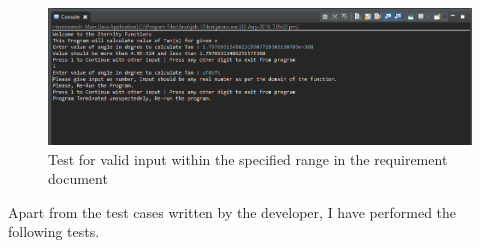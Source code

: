 \documentclass[11pt, english]{report}
\begin{document}
\begin{figure}[H]
  
  \includegraphics[width=1\textwidth]{testing/invalidrangeinput.PNG}
  \centering
  \caption{ Test for valid input within the specified range in the requirement document
}
\end{figure}

Apart from the test cases written by the developer, I have performed the following tests. 
\vspace*{1.5in}
\end{document}
